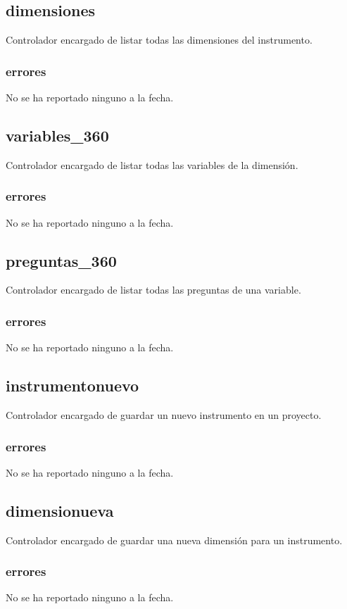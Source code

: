 \documentclass[10pt,a4paper]{book}
\begin{document}
	\subsection{dimensiones}
	Controlador encargado de listar todas las dimensiones del instrumento.
	\subsubsection{errores}
	No se ha reportado ninguno a la fecha.

	\subsection{variables\_360}
	Controlador encargado de listar todas las variables de la dimensión.
	\subsubsection{errores}
	No se ha reportado ninguno a la fecha.

	\subsection{preguntas\_360}
	Controlador encargado de listar todas las preguntas de una variable.
	\subsubsection{errores}
	No se ha reportado ninguno a la fecha.

	\subsection{instrumentonuevo}
	Controlador encargado de guardar un nuevo instrumento en un proyecto.
	\subsubsection{errores}
	No se ha reportado ninguno a la fecha.

	\subsection{dimensionueva}
	Controlador encargado de guardar una nueva dimensión para un instrumento.
	\subsubsection{errores}
	No se ha reportado ninguno a la fecha.
\end{document}

